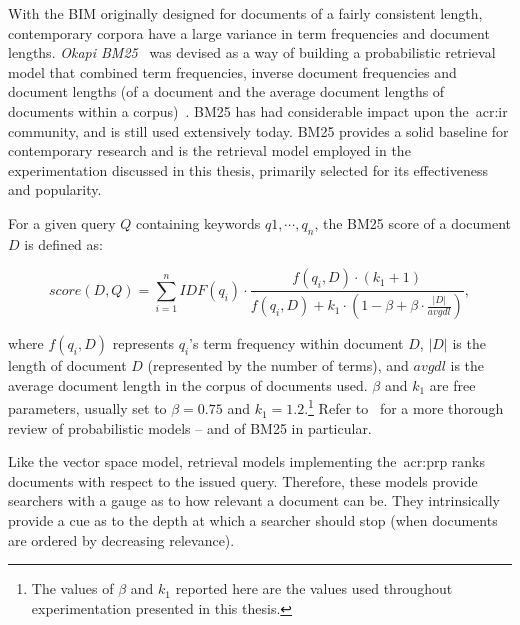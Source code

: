With the BIM originally designed for documents of a fairly consistent length, contemporary corpora have a large variance in term frequencies and document lengths. \emph{Okapi BM25}~\citep{robertson1995trec3} was devised as a way of building a probabilistic retrieval model that combined term frequencies, inverse document frequencies and document lengths (of a document and the average document lengths of documents within a corpus)~\citep{sparck2000probabilistic}. BM25 has had considerable impact upon the~\gls{acr:ir} community, and is still used extensively today. BM25 provides a solid baseline for contemporary research and is the retrieval model employed in the experimentation discussed in this thesis, primarily selected for its effectiveness and popularity.

For a given query $Q$ containing keywords $q1, \cdots, q_n$, the BM25 score of a document $D$ is defined as:

\begin{equation}
score(D,Q) = \sum_{i=1}^{n} IDF(q_i) \cdot \frac{f(q_i,D)\cdot(k_1 + 1)}{f(q_i,D) + k_1 \cdot (1 - \beta + \beta \cdot \frac{|D|}{avgdl})},
\end{equation}

\noindent
where $f(q_i,D)$ represents $q_i$'s term frequency within document $D$, $|D|$ is the length of document $D$ (represented by the number of terms), and $avgdl$ is the average document length in the corpus of documents used. $\beta$ and $k_1$ are free parameters, usually set to $\beta=0.75$ and $k_1=1.2$.\footnote{The values of $\beta$ and $k_1$ reported here are the values used throughout experimentation presented in this thesis.} Refer to~\cite{robertson2009probabilistic_models} for a more thorough review of probabilistic models -- and of BM25 in particular.

Like the vector space model, retrieval models implementing the~\gls{acr:prp} ranks documents with respect to the issued query. Therefore, these models provide searchers with a gauge as to how relevant a document can be. They intrinsically provide a cue as to the depth at which a searcher should stop (when documents are ordered by decreasing relevance).

